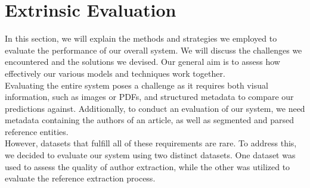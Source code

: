 \FloatBarrier

\section{Extrinsic Evaluation}\label{sec:results_extrinsic}
In this section, we will explain the methods and strategies we employed to evaluate the performance of our overall system. We will discuss the challenges we encountered and the solutions we devised. Our general aim is to assess how effectively our various models and techniques work together.\\
Evaluating the entire system poses a challenge as it requires both visual information, such as images or PDFs, and structured metadata to compare our predictions against. Additionally, to conduct an evaluation of our system, we need metadata containing the authors of an article, as well as segmented and parsed reference entities.\\
However, datasets that fulfill all of these requirements are rare. To address this, we decided to evaluate our system using two distinct datasets. One dataset was used to assess the quality of author extraction, while the other was utilized to evaluate the reference extraction process.

